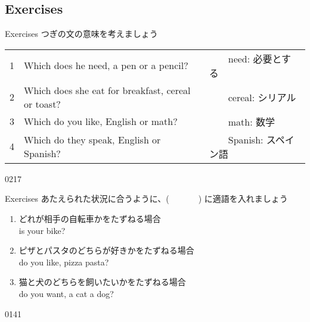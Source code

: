 \documentclass[aspectratio=169,xcolor={dvipsnames,table}]{beamer}
\begin{document}
\subsection{Exercises}
\begin{frame}[plain]{Exercises}
つぎの文の意味を考えましょう

\begin{tabular}{rll}
1& Which does he need, a pen or a pencil? &　　{\small need: 必要とする} \\
2&Which does she eat for breakfast, cereal or toast? & 　　{\small cereal: シリアル}\\
3& Which do you like, English or math? & 　　{\small math: 数学}\\
4& Which do they speak, English or Spanish?&　　{\small Spanish: スペイン語} \\
\end{tabular}

\mbox{}\hfill{\tiny 0217}\,{\scriptsize {}}
\end{frame}
\begin{frame}[plain]{Exercises}
 あたえられた状況に合うように、(~~~~~~~) に適語を入れましょう

\begin{enumerate}
 \item どれが相手の自転車かをたずねる場合\\
 is your bike?
 \item ピザとパスタのどちらが好きかをたずねる場合\\
 do you like, pizza  pasta?
 \item 猫と犬のどちらを飼いたいかをたずねる場合\\
 do you want, a cat  a dog?
\end{enumerate}

\mbox{}\hfill{\tiny 0141}\,{\scriptsize {}}

\end{frame}
\end{document}
